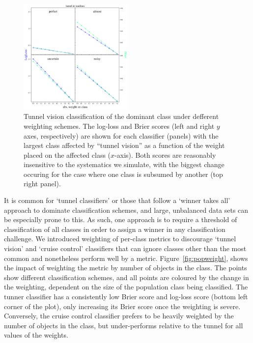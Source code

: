 \begin{figure}
	\begin{center}
		\includegraphics[width=0.5\textwidth]{./fig/tunnel_abs_weights_on_baselines.png}
		\caption{Tunnel vision classification of the dominant class under defferent weighting schemes.
		The log-loss and Brier scores (left and right $y$ axes, respectively) are shown for each classifier (panels) with the largest class affected by ``tunnel vision'' as a function of the weight placed on the affected class ($x$-axis).
		Both scores are reasonably insensitive to the systematics we simulate, with the biggest change occuring for the case where one class is subsumed by another (top right panel).\label{fig:tunnel}}
	\end{center}
\end{figure}

It is common for `tunnel classifiers' or those that follow a `winner takes all' approach to dominate classification schemes, and large, unbalanced data sets can be especially prone to this.
As such, one approach is to require a threshold of classification of all classes in order to assign a winner in any classification challenge.
We introduced weighting of per-class metrics to discourage `tunnel vision' and `cruise control' classifiers that can ignore classes other than the most common and nonetheless perform well by a metric.
Figure~\ref{fig:popweight}, shows the impact of weighting the metric by number of objects in the class.
The points show different classification schemes, and all points are coloured by the change in the weighting, dependent on the size of the population class being classified.
The tunner classifier has a consistently low Brier score and log-loss score (bottom left corner of the plot), only increasing its Brier score once the weighting is severe.
Conversely, the cruise control classifier prefers to be heavily weighted by the number of objects in the class, but under-performs relative to the tunnel for all values of the weights.

